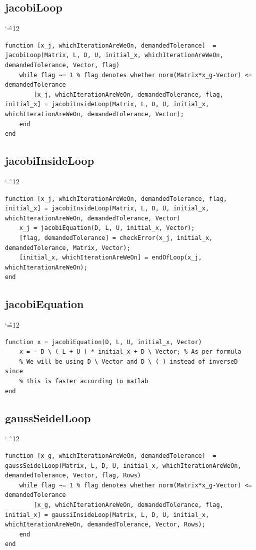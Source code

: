 \documentclass[12pt]{report}
\newenvironment{simplechar}{%
   \catcode`\^=12
}{}
\begin{document}
\subsection{jacobiLoop}
\begin{simplechar}
\begin{lstlisting}
function [x_j, whichIterationAreWeOn, demandedTolerance]  = jacobiLoop(Matrix, L, D, U, initial_x, whichIterationAreWeOn, demandedTolerance, Vector, flag)
    while flag ~= 1 % flag denotes whether norm(Matrix*x_g-Vector) <= demandedTolerance
        [x_j, whichIterationAreWeOn, demandedTolerance, flag, initial_x] = jacobiInsideLoop(Matrix, L, D, U, initial_x, whichIterationAreWeOn, demandedTolerance, Vector);
    end
end
\end{lstlisting}
\end{simplechar}

\subsection{jacobiInsideLoop}
\begin{simplechar}
\begin{lstlisting}
function [x_j, whichIterationAreWeOn, demandedTolerance, flag, initial_x] = jacobiInsideLoop(Matrix, L, D, U, initial_x, whichIterationAreWeOn, demandedTolerance, Vector)
    x_j = jacobiEquation(D, L, U, initial_x, Vector);
    [flag, demandedTolerance] = checkError(x_j, initial_x, demandedTolerance, Matrix, Vector);
    [initial_x, whichIterationAreWeOn] = endOfLoop(x_j, whichIterationAreWeOn);
end
\end{lstlisting}
\end{simplechar}

\subsection{jacobiEquation}
\begin{simplechar}
\begin{lstlisting}
function x = jacobiEquation(D, L, U, initial_x, Vector)
    x = - D \ ( L + U ) * initial_x + D \ Vector; % As per formula
    % We will be using D \ Vector and D \ ( ) instead of inverseD since
    % this is faster according to matlab
end
\end{lstlisting}
\end{simplechar}

\subsection{gaussSeidelLoop}
\begin{simplechar}
\begin{lstlisting}
function [x_g, whichIterationAreWeOn, demandedTolerance]  = gaussSeidelLoop(Matrix, L, D, U, initial_x, whichIterationAreWeOn, demandedTolerance, Vector, flag, Rows)
    while flag ~= 1 % flag denotes whether norm(Matrix*x_g-Vector) <= demandedTolerance
        [x_g, whichIterationAreWeOn, demandedTolerance, flag, initial_x] = gaussiInsideLoop(Matrix, L, D, U, initial_x, whichIterationAreWeOn, demandedTolerance, Vector, Rows);
    end
end
\end{lstlisting}
\end{simplechar}
\end{document}
